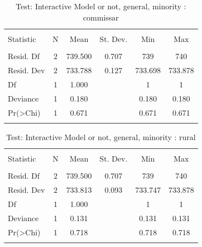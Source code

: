 \documentclass[12pt,letterpaper]{article}
\begin{document}
\begin{table}[!htbp] \centering 
	\caption{Test: Interactive Model or not, general, minority : commissar} 
	\label{} 
	\begin{tabular}{@{\extracolsep{5pt}}lccccc} 
		\\[-1.8ex]\hline 
		\hline \\[-1.8ex] 
		Statistic & \multicolumn{1}{c}{N} & \multicolumn{1}{c}{Mean} & \multicolumn{1}{c}{St. Dev.} & \multicolumn{1}{c}{Min} & \multicolumn{1}{c}{Max} \\ 
		\hline \\[-1.8ex] 
		Resid. Df & 2 & 739.500 & 0.707 & 739 & 740 \\ 
		Resid. Dev & 2 & 733.788 & 0.127 & 733.698 & 733.878 \\ 
		Df & 1 & 1.000 &  & 1 & 1 \\ 
		Deviance & 1 & 0.180 &  & 0.180 & 0.180 \\ 
		Pr(\textgreater Chi) & 1 & 0.671 &  & 0.671 & 0.671 \\ 
		\hline \\[-1.8ex] 
	\end{tabular} 
\end{table} 

\begin{table}[!htbp] \centering 
	\caption{Test: Interactive Model or not, general, minority : rural} 
	\label{} 
	\begin{tabular}{@{\extracolsep{5pt}}lccccc} 
		\\[-1.8ex]\hline 
		\hline \\[-1.8ex] 
		Statistic & \multicolumn{1}{c}{N} & \multicolumn{1}{c}{Mean} & \multicolumn{1}{c}{St. Dev.} & \multicolumn{1}{c}{Min} & \multicolumn{1}{c}{Max} \\ 
		\hline \\[-1.8ex] 
		Resid. Df & 2 & 739.500 & 0.707 & 739 & 740 \\ 
		Resid. Dev & 2 & 733.813 & 0.093 & 733.747 & 733.878 \\ 
		Df & 1 & 1.000 &  & 1 & 1 \\ 
		Deviance & 1 & 0.131 &  & 0.131 & 0.131 \\ 
		Pr(\textgreater Chi) & 1 & 0.718 &  & 0.718 & 0.718 \\ 
		\hline \\[-1.8ex] 
	\end{tabular} 
\end{table} 
\end{document}
